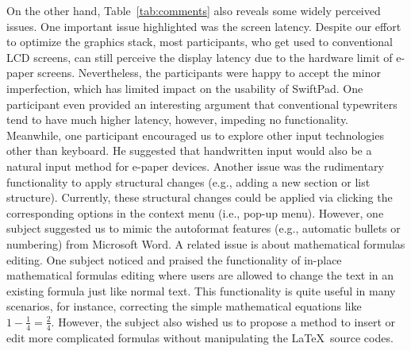 \documentclass[]{sigchi}
\begin{document}


On the other hand, Table~\ref{tab:comments} also reveals some widely perceived issues. 
One important issue highlighted was the screen latency. 
Despite our effort to optimize the graphics stack, most participants, who get used to conventional LCD screens, can still perceive the display latency due to the hardware limit of e-paper screens.
Nevertheless, the participants were happy to accept the minor imperfection, which has limited impact on the usability of SwiftPad. One participant even provided an interesting argument that conventional typewriters tend to have much higher latency, however, impeding no functionality. 
Meanwhile, one participant encouraged us to explore other input technologies other than keyboard. He suggested that handwritten input would also be a natural input method for e-paper devices.
Another issue was the rudimentary functionality to apply structural changes (e.g., adding a new section or list structure). 
Currently, these structural changes could be applied via clicking the corresponding options in the context menu (i.e., pop-up menu).
However, one subject suggested us to mimic the autoformat features (e.g., automatic bullets or numbering) from Microsoft Word.
A related issue is about mathematical formulas editing. One subject noticed and praised the functionality of in-place mathematical formulas editing where users are allowed to change the text in an existing formula just like normal text. This functionality is quite useful in many scenarios, for instance, correcting the simple mathematical equations like $1 - \frac{1}{4} = \frac{2}{4}$. However, the subject also wished us to propose a method to insert or edit more complicated formulas without manipulating the \LaTeX\ source codes. 
\end{document}
